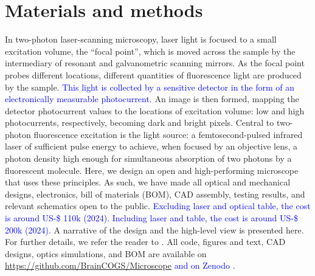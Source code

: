 \documentclass[10pt,letterpaper]{article}
\begin{document}
\section*{Materials and methods}
In two-photon laser-scanning microscopy\cite{Denk1990}, laser light is focused to a small excitation volume,  the ``focal point'', which is moved across the sample by the intermediary of resonant and galvanometric scanning mirrors. As the focal point probes different locations, different quantities of fluorescence light are produced by the sample. \textcolor{blue}{This light is collected by a sensitive detector in the form of an electronically measurable photocurrent.} An image is then formed, mapping the detector photocurrent values to the locations of excitation volume: low and high photocurrents, respectively, becoming dark and bright pixels. Central to two-photon fluorescence excitation is the light source: a femtosecond-pulsed infrared laser of sufficient pulse energy to achieve, when focused by an objective lens, a photon density high enough for simultaneous absorption of two photons by a fluorescent molecule. Here, we design an open and high-performing microscope that uses these principles. As such, we have made all optical and mechanical designs, electronics, bill of materials (BOM), CAD assembly, testing results, and relevant schematics open to the public. \textcolor{blue}{Excluding laser and optical table, the cost is around US-\$ 110k (2024). Including laser and table, the cost is around US-\$ 200k (2024).} A narrative of the design and the high-level view is presented here. For further details, we refer the reader to . All code, figures and text, CAD designs, optics simulations, and BOM are available on  \url{https://github.com/BrainCOGS/Microscope} \textcolor{blue}{and on Zenodo \cite{Zenodo2024}.}
\end{document}
